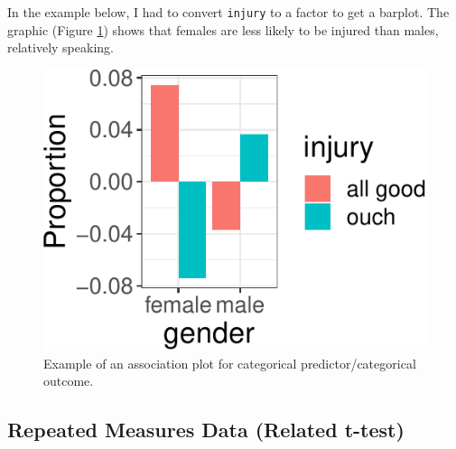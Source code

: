 \documentclass[
  doc]{apa6}
\newenvironment{Shaded}{\begin{snugshade}}{\end{snugshade}}
\newcommand{\DataTypeTok}[1]{\textcolor[rgb]{0.13,0.29,0.53}{#1}}
\newcommand{\DecValTok}[1]{\textcolor[rgb]{0.00,0.00,0.81}{#1}}
\newcommand{\KeywordTok}[1]{\textcolor[rgb]{0.13,0.29,0.53}{\textbf{#1}}}
\newcommand{\NormalTok}[1]{#1}
\newcommand{\OperatorTok}[1]{\textcolor[rgb]{0.81,0.36,0.00}{\textbf{#1}}}
\newcommand{\StringTok}[1]{\textcolor[rgb]{0.31,0.60,0.02}{#1}}
\begin{document}
In the example below, I had to convert \texttt{injury} to a factor to get a barplot. The graphic (Figure \ref{fig:association}) shows that females are less likely to be injured than males, relatively speaking.

\begin{Shaded}
\end{Shaded}

\begin{figure}
\centering
\includegraphics{flexplot_psychmeth_files/figure-latex/association-1.pdf}
\caption{\label{fig:association}Example of an association plot for categorical predictor/categorical outcome.\label{fig:association}}
\end{figure}

\hypertarget{repeated-measures-data-related-t-test}{%
\subsection{Repeated Measures Data (Related t-test)}\label{repeated-measures-data-related-t-test}}
\end{document}
